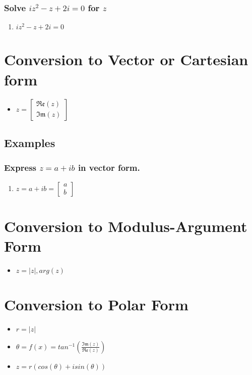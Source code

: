 \documentclass{report}
\renewcommand{\vmatrix}[2]{\begin{bmatrix}#1\\#2\end{bmatrix}}
\newcommand{\re}[1]{\mathfrak{Re}(#1)}
\newcommand{\im}[1]{\mathfrak{Im}(#1)}
\newcommand{\abs}[1]{\mathopen|#1\mathclose|}
\renewcommand{\arg}[1]{arg(#1)}
\renewcommand{\sin}[1]{sin(#1)}
\renewcommand{\cos}[1]{cos(#1)}
\renewcommand{\arctan}[1]{f(x)=tan^{-1}(#1)}
\begin{document}
                \subsubsection{Solve $iz^2-z+2i=0$ for $z$}
                    \begin{enumerate}
                        \item $iz^2-z+2i=0$
                    \end{enumerate}
        \section{Conversion to Vector or Cartesian form}
            \begin{itemize}
                \item $z=\vmatrix{\re{z}}{\im{z}}$
            \end{itemize}
            \subsection{Examples}
                \subsubsection{Express $z=a+ib$ in vector form.}
                    \begin{enumerate}
                        \item $z=a+ib=\vmatrix{a}{b}$
                    \end{enumerate}
        \section{Conversion to Modulus-Argument Form}
            \begin{itemize}
                \item $z=\abs{z}, \arg{z}$
            \end{itemize}
        \section{Conversion to Polar Form}
            \begin{itemize}
                \item $r=\abs{z}$
                \item $\theta=\arctan{\frac{\im{z}}{\re{z}}}$
                \item $z=r(\cos{\theta}+i\sin{\theta})$
            \end{itemize}
\end{document}
